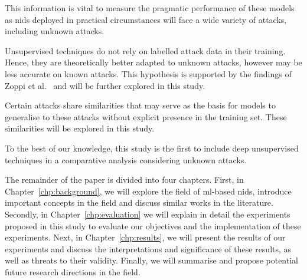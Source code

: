\begin{center}
\end{center}

This information is vital to measure the pragmatic performance of these models
as \gls{nids} deployed in practical circumstances will face a wide variety of
attacks, including unknown attacks.

\begin{center}
\end{center}

Unsupervised techniques do not rely on labelled attack data in their training.
Hence, they are theoretically better adapted to unknown attacks, however may be
less accurate on known attacks. This hypothesis is supported by the findings of
Zoppi et al.~\cite{Zoppi} and will be further explored in this study.

\hypertarget{obj3}{}
\begin{center}
\end{center}

Certain attacks share similarities that may serve as the basis for models to
generalise to these attacks without explicit presence in the training set.
These similarities will be explored in this study.

To the best of our knowledge, this study is the first to include deep
unsupervised techniques in a comparative analysis considering unknown attacks.

The remainder of the paper is divided into four chapters. First, in
Chapter~\ref{chp:background}, we will explore the field of \gls{ml}-based
\gls{nids}, introduce important concepts in the field and discuss similar works
in the literature. Secondly, in Chapter~\ref{chp:evaluation} we will explain in
detail the experiments proposed in this study to evaluate our objectives and
the implementation of these experiments. Next, in Chapter~\ref{chp:results},
we will present the results of our experiments and discuss the interpretations
and significance of these results, as well as threats to their validity.
Finally, we will summarise and propose potential future research directions in
the field.
